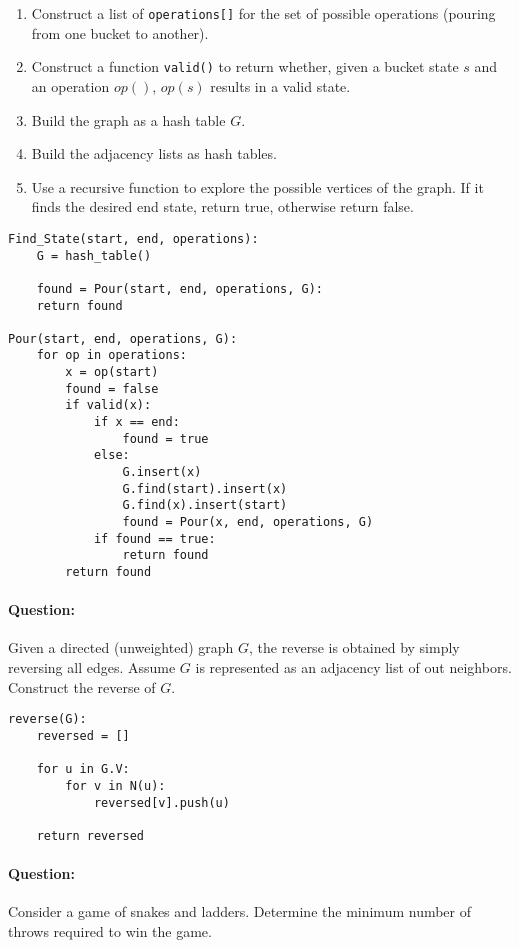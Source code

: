 \documentclass{article}
\newcommand{\code}[1]{\texttt{#1}}
\begin{document}
\begin{enumerate}
    \item[] Construct a list of \code{operations[]} for the set of possible operations (pouring from one bucket to another). 
    \item[] Construct a function \code{valid()} to return whether, given a bucket state \(s\) and an operation \(op()\), \(op(s)\) results in a valid state. 
    \item[] Build the graph as a hash table \(G\). 
    \item[] Build the adjacency lists as hash tables.
    \item[] Use a recursive function to explore the possible vertices of the graph. If it finds the desired end state, return true, otherwise return false.
\end{enumerate}

\begin{lstlisting}
Find_State(start, end, operations):
    G = hash_table()

    found = Pour(start, end, operations, G):
    return found

Pour(start, end, operations, G):
    for op in operations:
        x = op(start)
        found = false
        if valid(x):
            if x == end:
                found = true
            else:
                G.insert(x)
                G.find(start).insert(x)
                G.find(x).insert(start)
                found = Pour(x, end, operations, G)
            if found == true:
                return found
        return found
\end{lstlisting}     

\paragraph{Question:} Given a directed (unweighted) graph \(G\), the reverse is obtained by simply reversing all edges. Assume \(G\) is represented as an adjacency list of out neighbors. Construct the reverse of \(G\).

\begin{lstlisting}
reverse(G):
    reversed = []

    for u in G.V:
        for v in N(u):
            reversed[v].push(u)
    
    return reversed
\end{lstlisting}

\paragraph{Question:} Consider a game of snakes and ladders. Determine the minimum number of throws required to win the game.
\end{document}
